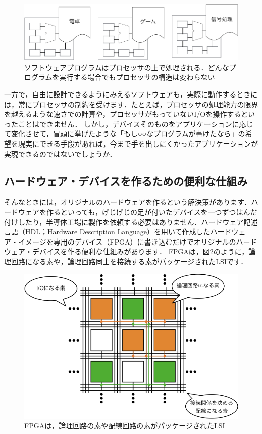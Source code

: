 \documentclass[a4paper,dvipdfmx]{jsarticle}
\begin{document}
 \begin{figure}[H]
  \begin{center}
   \includegraphics[width=.95\textwidth]{chapter01_figures/software_on_processor.png}
  \end{center}
  \caption{ソフトウェアプログラムはプロセッサの上で処理される．どんなプログラムを実行する場合でもプロセッサの構造は変わらない \label{fig:software_on_processor}}
 \end{figure}

一方で，自由に設計できるようにみえるソフトウェアも，実際に動作するときには，常にプロセッサの制約を受けます．たとえば，プロセッサの処理能力の限界を越えるような速さでの計算や，プロセッサがもっていないI/Oを操作するといったことはできません．
しかし，デバイスそのものをアプリケーションに応じて変化させて，冒頭に挙げたような「もし○○なプログラムが書けたなら」の希望を現実にできる手段があれば，今まで手を出しにくかったアプリケーションが実現できるのではないでしょうか．

\subsection{ハードウェア・デバイスを作るための便利な仕組み}
そんなときには，オリジナルのハードウェアを作るという解決策があります．ハードウェアを作るといっても，げじげじの足が付いたデバイスを一つずつはんだ付けしたり，半導体工場に製作を依頼する必要はありません．ハードウェア記述言語（HDL；Hardware Description Language）を用いて作成したハードウェア・イメージを専用のデバイス（FPGA）に書き込むだけでオリジナルのハードウェア・デバイスを作る便利な仕組みがあります．
FPGAは，図\ref{fig:fpga_simple_image}のように，論理回路になる素や，論理回路同士を接続する素がパッケージされたLSIです．

 \begin{figure}[H]
  \begin{center}
   \includegraphics[width=.8\textwidth]{chapter01_figures/fpga_simple_image.png}
  \end{center}
  \caption{FPGAは，論理回路の素や配線回路の素がパッケージされたLSI \label{fig:fpga_simple_image}}
 \end{figure}
\end{document}
